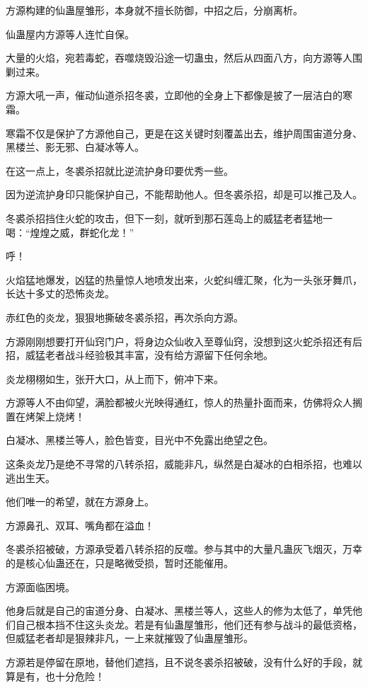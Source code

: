 
\begin{this_body}

方源构建的仙蛊屋雏形，本身就不擅长防御，中招之后，分崩离析。

仙蛊屋内方源等人连忙自保。

大量的火焰，宛若毒蛇，吞噬烧毁沿途一切蛊虫，然后从四面八方，向方源等人围剿过来。

方源大吼一声，催动仙道杀招冬裘，立即他的全身上下都像是披了一层洁白的寒霜。

寒霜不仅是保护了方源他自己，更是在这关键时刻覆盖出去，维护周围宙道分身、黑楼兰、影无邪、白凝冰等人。

在这一点上，冬裘杀招就比逆流护身印要优秀一些。

因为逆流护身印只能保护自己，不能帮助他人。但冬裘杀招，却是可以推己及人。

冬裘杀招挡住火蛇的攻击，但下一刻，就听到那石莲岛上的威猛老者猛地一喝：“煌煌之威，群蛇化龙！”

呼！

火焰猛地爆发，凶猛的热量惊人地喷发出来，火蛇纠缠汇聚，化为一头张牙舞爪，长达十多丈的恐怖炎龙。

赤红色的炎龙，狠狠地撕破冬裘杀招，再次杀向方源。

方源刚刚想要打开仙窍门户，将身边众仙收入至尊仙窍，没想到这火蛇杀招还有后招，威猛老者战斗经验极其丰富，没有给方源留下任何余地。

炎龙栩栩如生，张开大口，从上而下，俯冲下来。

方源等人不由仰望，满脸都被火光映得通红，惊人的热量扑面而来，仿佛将众人搁置在烤架上烧烤！

白凝冰、黑楼兰等人，脸色皆变，目光中不免露出绝望之色。

这条炎龙乃是绝不寻常的八转杀招，威能非凡，纵然是白凝冰的白相杀招，也难以逃出生天。

他们唯一的希望，就在方源身上。

方源鼻孔、双耳、嘴角都在溢血！

冬裘杀招被破，方源承受着八转杀招的反噬。参与其中的大量凡蛊灰飞烟灭，万幸的是核心仙蛊还在，只是略微受损，暂时还能催用。

方源面临困境。

他身后就是自己的宙道分身、白凝冰、黑楼兰等人，这些人的修为太低了，单凭他们自己根本挡不住这头炎龙。若是有仙蛊屋雏形，他们还有参与战斗的最低资格，但威猛老者却是狠辣非凡，一上来就摧毁了仙蛊屋雏形。

方源若是停留在原地，替他们遮挡，且不说冬裘杀招被破，没有什么好的手段，就算是有，也十分危险！


\end{this_body}
